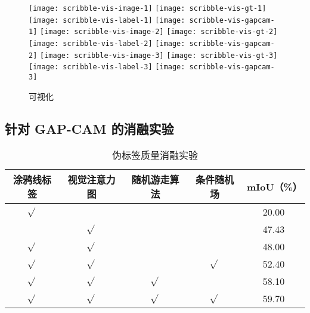 \begin{figure}[h]
\centering
\texttt{[image: scribble-vis-image-1]}
\hfil
\texttt{[image: scribble-vis-gt-1]}
\hfil
\texttt{[image: scribble-vis-label-1]}
\hfil
\texttt{[image: scribble-vis-gapcam-1]}
\vfil
\texttt{[image: scribble-vis-image-2]}
\hfil
\texttt{[image: scribble-vis-gt-2]}
\hfil
\texttt{[image: scribble-vis-label-2]}
\hfil
\texttt{[image: scribble-vis-gapcam-2]}
\vfil
\texttt{[image: scribble-vis-image-3]}
\hfil
\texttt{[image: scribble-vis-gt-3]}
\hfil
\texttt{[image: scribble-vis-label-3]}
\hfil
\texttt{[image: scribble-vis-gapcam-3]}
\hfil
{}
\hfil
{}
\hfil
{}
\caption{可视化}
\label{fig:scribble-vis}
\end{figure}

\subsection{针对 GAP-CAM 的消融实验}

\begin{table}[h]\label{tab:scribble-exp-pseudo}
\renewcommand{\arraystretch}{1.2}
\caption{伪标签质量消融实验}
\centering
\begin{tabular}{cccc|c}
\toprule[1.5pt]
涂鸦线标签 & 视觉注意力图 & 随机游走算法 & 条件随机场 & mIoU（\%） \\
\midrule[1.0pt]
$\sqrt{}$ &           &           &           & 20.00 \\
          & $\sqrt{}$ &           &           & 47.43 \\
$\sqrt{}$ & $\sqrt{}$ &           &           & 48.00 \\
$\sqrt{}$ & $\sqrt{}$ &           & $\sqrt{}$ & 52.40 \\
$\sqrt{}$ & $\sqrt{}$ & $\sqrt{}$ &           & 58.10 \\
$\sqrt{}$ & $\sqrt{}$ & $\sqrt{}$ & $\sqrt{}$ & 59.70 \\
\bottomrule[1.5pt]
\end{tabular}
\end{table}

